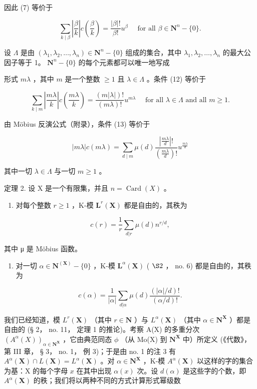 因此 (7) 等价于

\[
\sum_ {k \mid \beta} \left| \frac {\beta}{k} \right| c \left(\frac {\beta}{k}\right) = \frac {| \beta | !}{\beta !} u ^ {\beta} \quad \text { for   all } \beta \in \mathbf {N} ^ {n} - \{0 \}.\tag{12}
\]

设 \(\Lambda\) 是由 \((\lambda_1, \lambda_2, \ldots, \lambda_n) \in \mathbf{N}^n - \{0\}\) 组成的集合，其中 \(\lambda_1, \lambda_2, \ldots, \lambda_n\) 的最大公因子等于 1。 \(\mathbf{N}^n - \{0\}\) 的每个元素都可以唯一地写成

形式 \(m\lambda\) ，其中 \(m\) 是一个整数 \(\geqslant 1\) 且 \(\lambda \in \Lambda\) 。条件 (12) 等价于

\[
\sum_ {k \mid m} \left| \frac {m \lambda}{k} \right| c \left(\frac {m \lambda}{k}\right) = \frac {(m | \lambda |) !}{(m \lambda) !} u ^ {m \lambda} \quad \text { for   all } \lambda \in \Lambda \text { and   all } m \geqslant 1.\tag{13}
\]

由 Möbius 反演公式（附录），条件 (13) 等价于

\[
\left| m \lambda \right| c (m \lambda) = \sum_ {d \mid m} \mu (d) \frac {\left| \frac {m \lambda}{d} \right| !}{\left(\frac {m \lambda}{d}\right) !} u ^ {\frac {m \lambda}{d}}\tag{14}
\]

其中一切 \(\lambda\in\Lambda\) 与一切 \(m\geqslant1\) 。

定理 2. 设 X 是一个有限集，并且 \(n = \operatorname{Card}(X)\) 。

\begin{enumerate}
\def\labelenumi{(\alph{enumi})}
\tightlist
\item
  对每个整数 \(r \geqslant 1\) ，K-模 \(\mathbf{L}^r(\mathbf{X})\) 都是自由的，其秩为
\end{enumerate}

\[
c (r) = \frac {1}{r} \sum_ {d | r} \mu (d) n ^ {r / d},\tag{15}
\]

其中 μ 是 Möbius 函数。

\begin{enumerate}
\def\labelenumi{(\alph{enumi})}
\setcounter{enumi}{1}
\tightlist
\item
  对一切 \(\alpha \in \mathbf{N}^{(\mathbf{X})} - \{0\}\) ，K-模 \(\mathbf{L}^{\alpha}(\mathbf{X})\) ( \(\S 2\) ， no. 6) 都是自由的，其秩为
\end{enumerate}

\[
c (\alpha) = \frac {1}{| \alpha |} \sum_ {d | \alpha} \mu (d) \frac {(| \alpha | / d) !}{(\alpha / d) !}.\tag{16}
\]

我们已经知道，模 \(L^{r}(\mathbf{X})\) （其中 \(r \in \mathbf{N}\) ）与 \(L^{\alpha}(\mathbf{X})\) （其中 \(\alpha \in \mathbf{N}^{\mathbf{X}}\) ）都是自由的 (§ 2， no. 11， 定理 1 的推论)。考察 A(X) 的多重分次 \((A^{\alpha}(X))_{\alpha \in \mathbf{N}^{\mathbf{X}}}\) ，它由典范同态 \(\phi\) （从 Mo(X) 到 \(\mathbf{N}^{\mathbf{X}}\) 中）所定义 (《代数》， 第 III 章， § 3， no. 1， 例 3)；于是由 no. 1 的注 3 有 \(A^{\alpha}(\mathbf{X}) \cap L(\mathbf{X}) = L^{\alpha}(\mathbf{X})\) 。对 \(\alpha \in \mathbf{N}^{\mathbf{X}}\) ，K-模 \(A^{\alpha}(\mathbf{X})\) 以这样的字的集合为基：X 的每个字母 \(x\) 在其中出现 \(\alpha(x)\) 次。设 \(d(\alpha)\) 是这些字的个数，即 \(A^{\alpha}(\mathbf{X})\) 的秩；我们将以两种不同的方式计算形式幂级数

